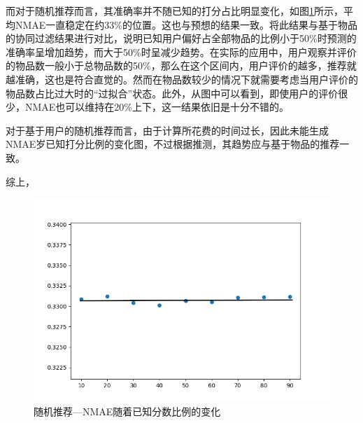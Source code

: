 \documentclass{article}
\begin{document}
\par 而对于随机推荐而言，其准确率并不随已知的打分占比明显变化，如图\ref{fig:trendRandom}所示，平均NMAE一直稳定在约33\%的位置。这也与预想的结果一致。将此结果与基于物品的协同过滤结果进行对比，说明已知用户偏好占全部物品的比例小于50\%时预测的准确率呈增加趋势，而大于50\%时呈减少趋势。在实际的应用中，用户观察并评价的物品数一般小于总物品数的50\%，那么在这个区间内，用户评价的越多，推荐就越准确，这也是符合直觉的。然而在物品数较少的情况下就需要考虑当用户评价的物品数占比过大时的``过拟合''状态。此外，从图中可以看到，即使用户的评价很少，NMAE也可以维持在20\%上下，这一结果依旧是十分不错的。
\par 对于基于用户的随机推荐而言，由于计算所花费的时间过长，因此未能生成NMAE岁已知打分比例的变化图，不过根据推测，其趋势应与基于物品的推荐一致。

\par 综上，

\begin{figure}[H]
    \centering
    \includegraphics[width=0.9\linewidth]{trendRandom.png}
    \caption{随机推荐---NMAE随着已知分数比例的变化}
    \label{fig:trendRandom}
\end{figure}

\end{document}
